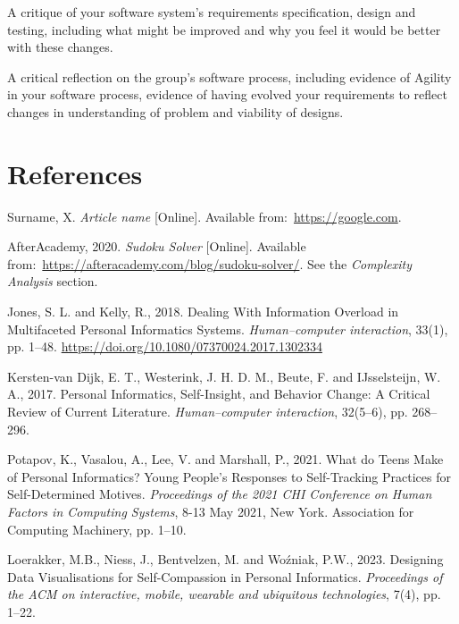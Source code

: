 \documentclass[12pt]{article}
\begin{document}
A critique of your software system’s requirements specification, design and testing,
including what might be improved and why you feel it would be better with these
changes.

A critical reflection on the group’s software process, including evidence of Agility in
your software process, evidence of having evolved your requirements to reflect
changes in understanding of problem and viability of designs.


\section{References}

\renewcommand{\refname}{} 
\vspace{-20pt}
\begin{thebibliography}{99}
     Surname, X. \textit{Article name} [Online].
    Available from:~\url{https://google.com}.

     AfterAcademy, 2020. \textit{Sudoku Solver} [Online].
    Available from:~\url{https://afteracademy.com/blog/sudoku-solver/}. See the
    \textit{Complexity Analysis} section.

    Jones, S. L. and Kelly, R., 2018. 
    Dealing With Information Overload in Multifaceted Personal Informatics Systems. 
    \textit{Human–computer interaction}, 33(1), pp. 1–48. \url{https://doi.org/10.1080/07370024.2017.1302334}

    Kersten-van Dijk, E. T., Westerink, J. H. D. M., Beute, F. and 
    IJsselsteijn, W. A., 2017. 
    Personal Informatics, Self-Insight, and Behavior Change: A Critical Review of Current Literature. 
    \textit{Human–computer interaction}, 32(5–6), pp. 268–296.

    Potapov, K., Vasalou, A., Lee, V. and Marshall, P., 2021. 
    What do Teens Make of Personal Informatics? 
    Young People's Responses to Self-Tracking Practices for Self-Determined Motives. 
    \textit{Proceedings of the 2021 CHI Conference on Human Factors in Computing Systems}, 
    8-13 May 2021, New York. Association for Computing Machinery, pp. 1–10.

    Loerakker, M.B., Niess, J., Bentvelzen, M. and Woźniak, P.W., 2023. 
    Designing Data Visualisations for Self-Compassion in Personal Informatics. 
    \textit{Proceedings of the ACM on interactive, mobile, wearable and ubiquitous technologies}, 7(4), pp. 1–22.


\end{thebibliography}
\end{document}
